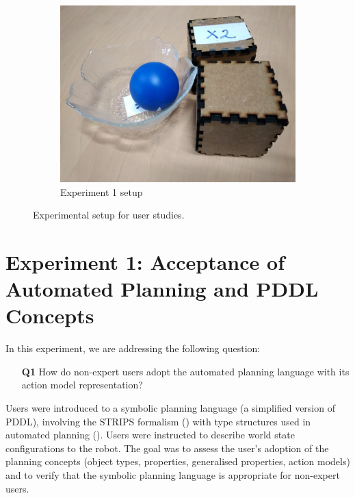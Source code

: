 \begin{figure}[htp]
\begin{subfigure}[t]{0.24\textwidth}
		\includegraphics[width=\textwidth]{figures/exp1-setup}%
		\caption{Experiment 1 setup}\label{fig:exp1-setup}%
	\end{subfigure} 	  
	\caption{Experimental setup for user studies.}
	\label{fig:pre-experiment}%
\end{figure}
\section{Experiment 1: Acceptance of Automated Planning and PDDL Concepts}\label{sec:Exp1}

In this experiment, we are addressing the following question:

\begin{enumerate}
	\item[\textbf{Q1}] How do non-expert users adopt the automated planning language with its action model representation?
\end{enumerate}

Users were introduced to a symbolic planning language (a simplified version of PDDL), involving the STRIPS formalism (\cite{fikes1971strips}) with type structures used in automated planning ().
Users were instructed to describe world state configurations to the robot.
The goal was to assess the user's adoption of the planning concepts (object types, properties, generalised properties, action models) and to verify that the symbolic planning language is appropriate for non-expert users.

